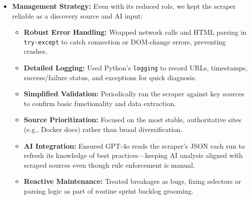 \begin{itemize}
    \item \textbf{Management Strategy:} Even with its reduced role, we kept the scraper reliable as a discovery source and AI input:
        \begin{itemize}
            \item \textbf{Robust Error Handling:} Wrapped network calls and HTML parsing in \texttt{try-except} to catch connection or DOM‐change errors, preventing crashes.
            \item \textbf{Detailed Logging:} Used Python’s \texttt{logging} to record URLs, timestamps, success/failure status, and exceptions for quick diagnosis.
            \item \textbf{Simplified Validation:} Periodically ran the scraper against key sources to confirm basic functionality and data extraction.
            \item \textbf{Source Prioritization:} Focused on the most stable, authoritative sites (e.g., Docker docs) rather than broad diversification.
            \item \textbf{AI Integration:} Ensured GPT-4o reads the scraper’s JSON each run to refresh its knowledge of best practices—keeping AI analysis aligned with scraped sources even though rule enforcement is manual.
            \item \textbf{Reactive Maintenance:} Treated breakages as bugs, fixing selectors or parsing logic as part of routine sprint backlog grooming.
        \end{itemize}
\end{itemize}

